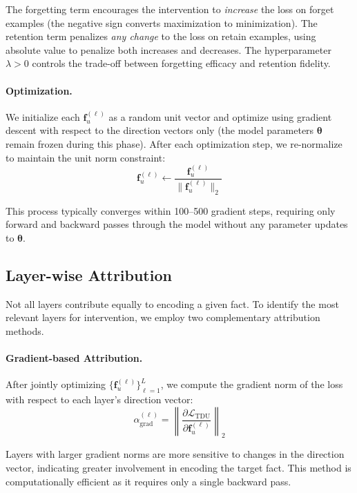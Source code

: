 The forgetting term encourages the intervention to \emph{increase} the loss on forget examples (the negative sign converts maximization to minimization). The retention term penalizes \emph{any change} to the loss on retain examples, using absolute value to penalize both increases and decreases. The hyperparameter $\lambda > 0$ controls the trade-off between forgetting efficacy and retention fidelity.

\paragraph{Optimization.}
We initialize each $\mathbf{f}_u^{(\ell)}$ as a random unit vector and optimize using gradient descent with respect to the direction vectors only (the model parameters $\bm{\theta}$ remain frozen during this phase). After each optimization step, we re-normalize to maintain the unit norm constraint:
\begin{equation}
    \mathbf{f}_u^{(\ell)} \leftarrow \frac{\mathbf{f}_u^{(\ell)}}{\|\mathbf{f}_u^{(\ell)}\|_2}
\end{equation}

This process typically converges within 100--500 gradient steps, requiring only forward and backward passes through the model without any parameter updates to $\bm{\theta}$.

\subsection{Layer-wise Attribution}
\label{sec:attribution}

Not all layers contribute equally to encoding a given fact. To identify the most relevant layers for intervention, we employ two complementary attribution methods.

\paragraph{Gradient-based Attribution.}
After jointly optimizing $\{\mathbf{f}_u^{(\ell)}\}_{\ell=1}^L$, we compute the gradient norm of the loss with respect to each layer's direction vector:
\begin{equation}
    \alpha^{(\ell)}_{\text{grad}} = \left\|\frac{\partial \mathcal{L}_{\text{TDU}}}{\partial \mathbf{f}_u^{(\ell)}}\right\|_2
    \label{eq:grad_attr}
\end{equation}

Layers with larger gradient norms are more sensitive to changes in the direction vector, indicating greater involvement in encoding the target fact. This method is computationally efficient as it requires only a single backward pass.

